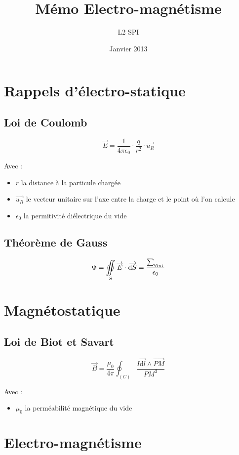 \documentclass[a4paper, 11pt]{article}
\title{Mémo Electro-magnétisme}
\author{L2 SPI}
\date{Janvier 2013}
\newcommand{\ve}{\overrightarrow}
\newcommand{\fint}{%
        \setbox0=\hbox{$\displaystyle \int\!\!\!\!\!\int$}
        \setbox1=\hbox to \wd0{\hfill$\bigcirc$\hfill}
        \setbox0=\hbox to \wd0{\copy0\hss\copy1}
        \mathop{\copy0}
    }
\begin{document}
	\maketitle

    \section{Rappels d'électro-statique}

    \subsection{Loi de Coulomb}

    $$\ve{E} = \frac{1}{4\pi\epsilon_0}\cdot\frac{q}{r^2}\cdot\ve{u_R}$$

    Avec :
    \begin{itemize}
        \item $r$ la distance à la particule chargée
        \item $\ve{u_R}$ le vecteur unitaire sur l'axe entre la charge et le point où l'on calcule
        \item $\epsilon_0$ la permitivité diélectrique du vide
    \end{itemize}

    \subsection{Théorème de Gauss}

    $$\Phi = \fint_{S}\ve{E}\cdot\ve{\mathrm{d}S} = \frac{\sum_{q_{int}}}{\epsilon_0}$$

    \section{Magnétostatique}

    \subsection{Loi de Biot et Savart}

    $$\ve{B} = \frac{\mu_0}{4\pi}\oint_{(C)}\frac{I\ve{\mathrm{d}l}\wedge\ve{PM}}{PM^3}$$

    Avec :
    \begin{itemize}
    \item $\mu_0$ la perméabilité magnétique du vide
    \end{itemize}

    \section{Electro-magnétisme}
\end{document}
